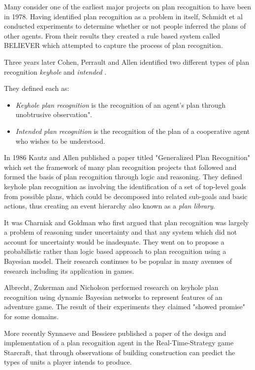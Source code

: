 \documentclass[parskip]{cs4rep}
\begin{document}
Many consider one of the earliest major projects on plan recognition to have been in 1978. Having identified plan recognition as a problem in itself, Schmidt et al \cite{journals/ai/SchmidtSG78} conducted experiments to determine whether or not people inferred the plans of other agents. From their results they created a rule based system called BELIEVER which attempted to capture the process of plan recognition. 

Three years later Cohen, Perrault and Allen identified two different types of plan recognition \textit{keyhole} and \textit{intended} \cite{Cohen82a}. 

They defined each as:

\begin{itemize}
\item
\textit{Keyhole plan recognition} is the recognition of an agent's plan through unobtrusive observation".
\item
\textit{Intended plan recognition} is the recognition of the plan of a cooperative agent who wishes to be understood.
\newline
\end{itemize}

In 1986 Kautz and Allen published a paper titled "Generalized Plan Recognition" \cite{conf/aaai/KautzA86} which set the framework of many plan recognition projects that followed and formed the basis of plan recognition through logic and reasoning. They defined keyhole plan recognition as involving the identification of a set of top-level goals from possible plans, which could be decomposed into related sub-goals and basic actions, thus creating an event hierarchy also known as a \textit{plan library}. 

It was Charniak and Goldman \cite{journals/ai/CharniakG93} who first argued that plan recognition was largely a problem of reasoning under uncertainty and that any system which did not account for uncertainty would be inadequate. They went on to propose a probabilistic rather than logic based approach to  plan recognition using a Bayesian model. Their research continues to be popular in many avenues of research including its application in games.

Albrecht, Zukerman and Nicholson \cite{Albrecht:1998:BMK:598277.598308} performed research on keyhole plan recognition using dynamic Bayesian networks to represent features of an adventure game. The result of their experiments they claimed "showed promise" for some domains. 

More recently Synnaeve and Bessiere \cite{conf/aiide/SynnaeveB11} published a paper of the design and implementation of a plan recognition agent in the Real-Time-Strategy game Starcraft, that through observations of building construction can predict the types of units a player intends to produce.
\end{document}
